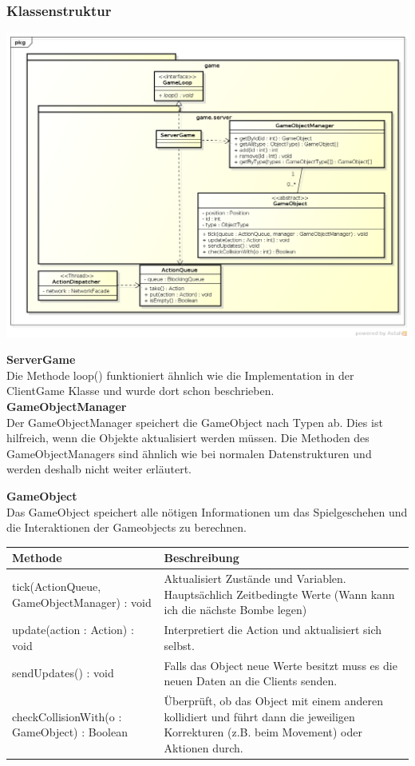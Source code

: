 \documentclass[11pt]{scrartcl}
\begin{document}
\subsubsection{Klassenstruktur}
\includegraphics[scale=0.5]{ClassDiagramGameServer}

\textbf{ServerGame}\\
Die Methode loop() funktioniert ähnlich wie die Implementation in der ClientGame Klasse und wurde dort schon beschrieben.\\

\textbf{GameObjectManager}\\
Der GameObjectManager speichert die GameObject nach Typen ab. Dies ist hilfreich, wenn die Objekte aktualisiert werden müssen. Die Methoden des GameObjectManagers sind ähnlich wie bei normalen Datenstrukturen und werden deshalb nicht weiter erläutert.\\

\newpage

\textbf{GameObject}\\
Das GameObject speichert alle nötigen Informationen um das Spielgeschehen und die Interaktionen der Gameobjects zu berechnen.\\


\begin{tabularx}{\linewidth}{l p{6cm}}
\textbf{Methode} & \textbf{Beschreibung}\\
\hline
tick(ActionQueue, GameObjectManager) : void & Aktualisiert Zustände und Variablen. Hauptsächlich Zeitbedingte Werte (Wann kann ich die nächste Bombe legen)\\
update(action : Action) : void & Interpretiert die Action und aktualisiert sich selbst.\\
sendUpdates() : void & Falls das Object neue Werte besitzt muss es die neuen Daten an die Clients senden.\\
checkCollisionWith(o : GameObject) : Boolean & Überprüft, ob das Object 
mit einem anderen kollidiert und führt dann die jeweiligen 
Korrekturen (z.B. beim Movement) oder Aktionen durch.\\

\end{tabularx}
\end{document}

